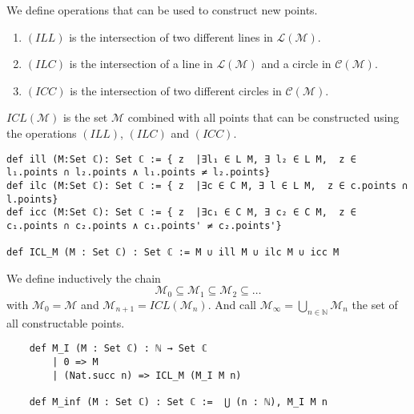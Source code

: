 \begin{definition}
    \label{def:rules_to_constructed_a_point}
    We define operations that can be used to construct new points.
    \begin{enumerate}
        \item $(ILL)$ is the intersection of two different lines in $\mathcal{L(M)}$.
        \item $(ILC)$ is the intersection of a line in $\mathcal{L(M)}$ and a circle in $\mathcal{C(M)}$.
        \item $(ICC)$ is the intersection of two different circles in $\mathcal{C(M)}$.
    \end{enumerate}
    $ICL(\mathcal{M})$ is the set $\mathcal{M}$ combined with all points that can be constructed using the operations $(ILL)$, $(ILC)$ and $(ICC)$.
\end{definition}

\begin{lstlisting}
def ill (M:Set ℂ): Set ℂ := { z  |∃l₁ ∈ L M, ∃ l₂ ∈ L M,  z ∈ l₁.points ∩ l₂.points ∧ l₁.points ≠ l₂.points}
def ilc (M:Set ℂ): Set ℂ := { z  |∃c ∈ C M, ∃ l ∈ L M,  z ∈ c.points ∩ l.points}
def icc (M:Set ℂ): Set ℂ := { z  |∃c₁ ∈ C M, ∃ c₂ ∈ C M,  z ∈ c₁.points ∩ c₂.points ∧ c₁.points' ≠ c₂.points'}    

def ICL_M (M : Set ℂ) : Set ℂ := M ∪ ill M ∪ ilc M ∪ icc M
\end{lstlisting}

\begin{definition}
    \label{def:set_of_constructable_points}
    We define inductively the chain
    \begin{equation*}
        \mathcal{M}_0 \subseteq \mathcal{M}_1 \subseteq \mathcal{M}_2 \subseteq \dots
    \end{equation*}
    with $\mathcal{M}_0 = \mathcal{M}$ and $\mathcal{M}_{n+1} = ICL(\mathcal{M}_n)$.\newline
    And call $\mathcal{M}_{\infty} = \bigcup_{n \in \mathbb{N}} \mathcal{M}_n$ the set of all constructable points.
\end{definition}

\begin{lstlisting}
    def M_I (M : Set ℂ) : ℕ → Set ℂ
        | 0 => M
        | (Nat.succ n) => ICL_M (M_I M n)

    def M_inf (M : Set ℂ) : Set ℂ :=  ⋃ (n : ℕ), M_I M n
\end{lstlisting}
